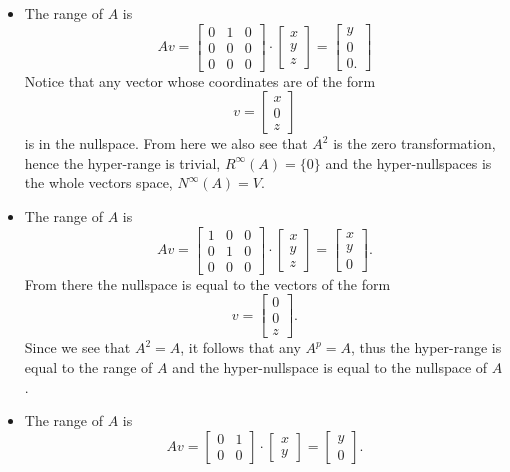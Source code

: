 \documentclass{article}
\begin{document}
\begin{solution}
  \begin{itemize}
    \item The range of $A$ is 
      \[A v = \begin{bmatrix} 0 & 1 & 0\\ 0 & 0 & 0\\ 0 & 0 & 0 \end{bmatrix} \cdot \begin{bmatrix} x\\ y\\ z \end{bmatrix} = \begin{bmatrix} y\\ 0\\ 0. \end{bmatrix}\]
      Notice that any vector whose coordinates are of the form 
      \[v = \begin{bmatrix} x\\ 0\\ z \end{bmatrix}\]
      is in the nullspace.
      From here we also see that $A^2$ is the zero transformation, hence the hyper-range is trivial, $R^{\infty}(A) = \{0\}$ and the hyper-nullspaces is the whole vectors space, $N^{\infty}(A) = V$.
    \item The range of $A$ is 
      \[A v = \begin{bmatrix} 1 & 0 & 0\\ 0 & 1 & 0\\ 0 & 0 & 0 \end{bmatrix} \cdot \begin{bmatrix} x\\ y\\ z \end{bmatrix} = \begin{bmatrix} x\\ y\\ 0 \end{bmatrix}.\]
      From there the nullspace is equal to the vectors of the form 
      \[v = \begin{bmatrix} 0\\ 0\\ z \end{bmatrix}.\]
      Since we see that $A^2 = A$, it follows that any $A^p = A$, thus the hyper-range is equal to the range of $A$ and the hyper-nullspace is equal to the nullspace of $A$.
    \item The range of $A$ is 
      \[A v = \begin{bmatrix} 0 & 1\\ 0 & 0 \end{bmatrix} \cdot \begin{bmatrix} x\\ y \end{bmatrix} = \begin{bmatrix} y\\ 0 \end{bmatrix}.\]

\end{itemize}
\end{solution}
\end{document}
